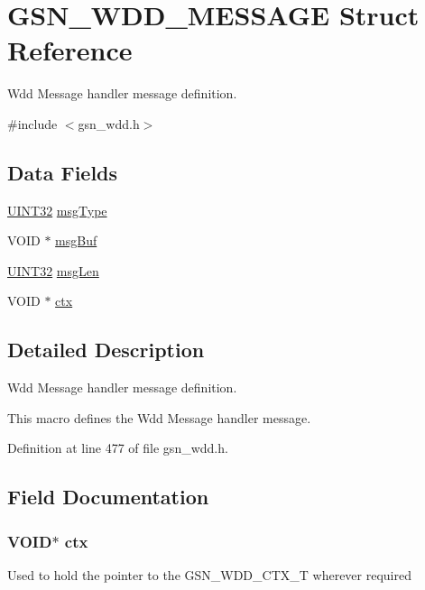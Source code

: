 \hypertarget{a00277}{
\section{GSN\_\-WDD\_\-MESSAGE Struct Reference}
\label{a00277}
}


Wdd Message handler message definition.  




{\ttfamily \#include $<$gsn\_\-wdd.h$>$}

\subsection*{Data Fields}
\begin{DoxyCompactItemize}
\item 
\hyperlink{a00660_gae1e6edbbc26d6fbc71a90190d0266018}{UINT32} \hyperlink{a00277_a46e39f3ee19777793465d737d462b41a}{msgType}
\item 
VOID $\ast$ \hyperlink{a00277_a72b1154b214c336a4c7d2673d86514b8}{msgBuf}
\item 
\hyperlink{a00660_gae1e6edbbc26d6fbc71a90190d0266018}{UINT32} \hyperlink{a00277_afa6b7ecbe2ec2cb4b1ccae61dba3724a}{msgLen}
\item 
VOID $\ast$ \hyperlink{a00277_add401254b29adaa41706c97d1c8d3e89}{ctx}
\end{DoxyCompactItemize}


\subsection{Detailed Description}
Wdd Message handler message definition. 

This macro defines the Wdd Message handler message. 

Definition at line 477 of file gsn\_\-wdd.h.



\subsection{Field Documentation}
\hypertarget{a00277_add401254b29adaa41706c97d1c8d3e89}{
\subsubsection[{ctx}]{\setlength{\rightskip}{0pt plus 5cm}VOID$\ast$ {\bf ctx}}}
\label{a00277_add401254b29adaa41706c97d1c8d3e89}
Used to hold the pointer to the GSN\_\-WDD\_\-CTX\_\-T wherever required 

